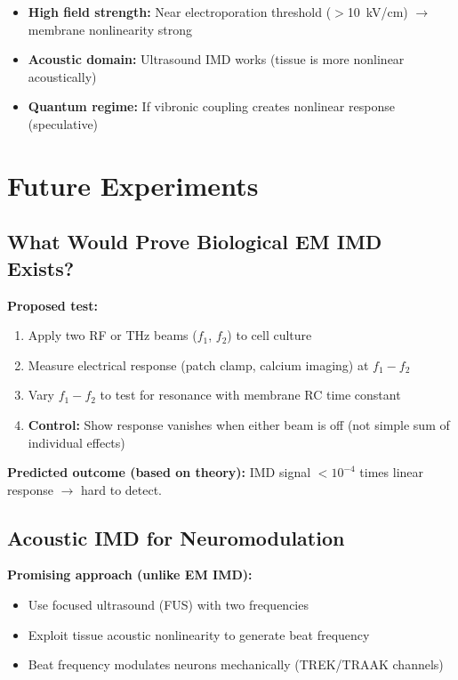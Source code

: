 \begin{itemize}
\item \textbf{High field strength:} Near electroporation threshold ($>$10~kV/cm) $\rightarrow$ membrane nonlinearity strong
\item \textbf{Acoustic domain:} Ultrasound IMD works (tissue is more nonlinear acoustically)
\item \textbf{Quantum regime:} If vibronic coupling creates nonlinear response (speculative)
\end{itemize}

\section{Future Experiments}

\subsection{What Would Prove Biological EM IMD Exists?}

\textbf{Proposed test:}
\begin{enumerate}
\item Apply two RF or THz beams ($f_1$, $f_2$) to cell culture
\item Measure electrical response (patch clamp, calcium imaging) at $f_1 - f_2$
\item Vary $f_1 - f_2$ to test for resonance with membrane RC time constant
\item \textbf{Control:} Show response vanishes when either beam is off (not simple sum of individual effects)
\end{enumerate}

\textbf{Predicted outcome (based on theory):} IMD signal $<10^{-4}$ times linear response $\rightarrow$ hard to detect.

\subsection{Acoustic IMD for Neuromodulation}

\textbf{Promising approach (unlike EM IMD):}
\begin{itemize}
\item Use focused ultrasound (FUS) with two frequencies
\item Exploit tissue acoustic nonlinearity to generate beat frequency
\item Beat frequency modulates neurons mechanically (TREK/TRAAK channels)
\end{itemize}

